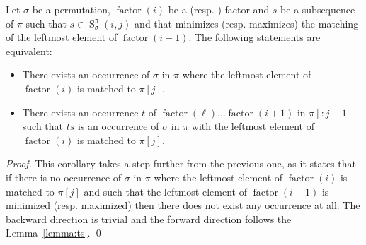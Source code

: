 \documentclass[a4paper]{llncs}
\newcommand{\RLMin}{\text{RLMin}\xspace}
\newcommand{\RLMax}{\text{RLMax}\xspace}
\newcommand{\ptext}{\pi}
\newcommand{\ppattern}{\sigma}
\DeclareMathOperator{\factor}{factor}
\DeclareMathOperator{\SETa}{S}
\newcommand{\SET}[4]{\SETa_{{#1}}^{{#2}}({#3},{#4})}
\begin{document}
\begin{corollary}
\label{corollary:we can chose a matching}
Let $\ppattern$ be a permutation,
$\factor(i)$ be a \RLMin (resp. \RLMax) factor
and
$s$ be a subsequence of $\pi$ such that $s \in \SET{\ppattern}{\ptext}{i}{j}$ and
that minimizes (resp. maximizes) the matching of the leftmost element of $\factor(i-1)$.
The following statements are equivalent:
\begin{itemize}
	\item There exists an occurrence
	 of $\ppattern$ in $\ptext$ where the leftmost element of $\factor(i)$ is matched to $\ptext[j]$.
	\item There exists an occurrence $t$ of $\factor(\ell)\ldots \factor(i+1)$ in $\ptext[:j-1]$  such that $ts$ is an occurrence of $\ppattern$ in $\ptext$ with the leftmost element of $\factor(i)$ is matched to $\ptext[j]$.
\end{itemize}
\end{corollary}

\begin{proof} %
This corollary takes a step further from the previous one, as it states that if there is no occurrence of $\ppattern$ in $\ptext$ where the leftmost element of $\factor(i)$ is matched to $\ptext[j]$ and such that
the leftmost element of $\factor(i-1)$ is minimized (resp. maximized)
then there does not exist any occurrence at all. The backward direction is trivial and the forward direction follows the Lemma~\ref{lemma:ts}.
\qed
\end{proof}


%
%
%
%



\end{document}
